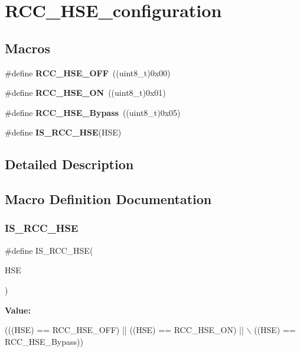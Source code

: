 \section{R\+C\+C\+\_\+\+H\+S\+E\+\_\+configuration}
\label{group__RCC__HSE__configuration}
\subsection*{Macros}
\begin{DoxyCompactItemize}
\item 
\#define \textbf{ R\+C\+C\+\_\+\+H\+S\+E\+\_\+\+O\+FF}~((uint8\+\_\+t)0x00)
\item 
\#define \textbf{ R\+C\+C\+\_\+\+H\+S\+E\+\_\+\+ON}~((uint8\+\_\+t)0x01)
\item 
\#define \textbf{ R\+C\+C\+\_\+\+H\+S\+E\+\_\+\+Bypass}~((uint8\+\_\+t)0x05)
\item 
\#define \textbf{ I\+S\+\_\+\+R\+C\+C\+\_\+\+H\+SE}(H\+SE)
\end{DoxyCompactItemize}


\subsection{Detailed Description}


\subsection{Macro Definition Documentation}
\mbox{\label{group__RCC__HSE__configuration_ga287bbcafd73d07ec915c2f793301908a}} 
\subsubsection{I\+S\+\_\+\+R\+C\+C\+\_\+\+H\+SE}
{\footnotesize\ttfamily \#define I\+S\+\_\+\+R\+C\+C\+\_\+\+H\+SE(\begin{DoxyParamCaption}\item[{}]{H\+SE }\end{DoxyParamCaption})}

{\bfseries Value\+:}
\begin{DoxyCode}
(((HSE) == RCC_HSE_OFF) || ((HSE) == RCC_HSE_ON) || \(\backslash\)
                         ((HSE) == RCC_HSE_Bypass))
\end{DoxyCode}



